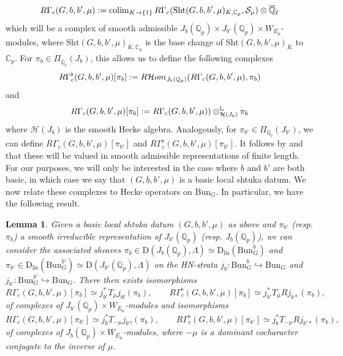 \documentclass[reqno,11pt]{amsart}
\newtheorem{lemma}[theorem]{Lemma}
\theoremstyle{remark}
\def\colim{\mathop{\rm colim}\nolimits}
\newcommand{\Q}{\mathbb{Q}}
\newcommand{\ov}{\overline}
\newcommand{\Sht}{\mathrm{Sht}}
\newcommand{\Bun}{\mathrm{Bun}}
\newcommand{\Dc}{\mathrm{D}}
\newcommand{\Dlis}{\mathrm{D}_{\mathrm{lis}}}
\begin{document}
\[ R\Gamma_{c}(G,b,b',\mu) := \colim_{K \rightarrow \{1\}} R\Gamma_{c}(\Sht(G,b,b',\mu)_{K,\mathbb{C}_{p}},\mathcal{S}_{\mu}) \otimes \overline{\mathbb{Q}}_{\ell} \]
which will be a complex of smooth admissible $J_{b}(\mathbb{Q}_{p}) \times J_{b'}(\mathbb{Q}_{p}) \times W_{E_{\mu}}$-modules, where $\Sht(G,b,b',\mu)_{K,\mathbb{C}_{p}}$ is the base change of $\Sht(G,b,b',\mu)_{K}$ to $\mathbb{C}_{p}$. For $\pi_{b} \in \Pi_{\ov{\Q}_{\ell}}(J_{b})$, this allows us to define the following complexes 
\begin{equation}{\label{eq: RGammaflat}}
    R\Gamma^{\flat}_{c}(G,b,b',\mu)[\pi_{b}] := R\mathcal{H}om_{J_{b}(\mathbb{Q}_{p})}(R\Gamma_{c}(G,b,b',\mu),\pi_{b})
\end{equation}
and
\begin{equation}{\label{eq: RGamma}}
    R\Gamma_{c}(G,b,b',\mu)[\pi_{b}] := R\Gamma_{c}(G,b,b',\mu)) \otimes^{\mathbb{L}}_{\mathcal{H}(J_{b})} \pi_{b}
\end{equation}
where $\mathcal{H}(J_{b})$ is the smooth Hecke algebra. Analogously, for $\pi_{b'} \in \Pi_{\ov{\Q}_{\ell}}(J_{b'})$, we can define $R\Gamma_{c}(G,b,b',\mu)[\pi_{b'}]$ and $R\Gamma^{\flat}_{c}(G,b,b',\mu)[\pi_{b'}]$. It follows by \cite[Corollary~I.7.3]{FS} and \cite[Page~317]{FS} that these will be valued in smooth admissible representations of finite length. For our purposes, we will only be interested in the case where $b$ and $b'$ are both basic, in which case we say that $(G,b,b',\mu)$ is a basic local shtuka datum. We now relate these complexes to Hecke operators on $\Bun_{G}$. In particular, we have the following result.
\begin{lemma}{\label{shimhecke}}{\cite[Section~IX.3]{FS}}
Given a basic local shtuka datum $(G,b,b',\mu)$ as above and $\pi_{b'}$ (resp. $\pi_{b}$) a smooth irreducible representation of $J_{b'}(\mathbb{Q}_{p})$ (resp. $J_{b}(\mathbb{Q}_{p})$), we can consider the associated sheaves $\pi_{b} \in \Dc(J_{b}(\mathbb{Q}_{p}),\Lambda) \simeq \Dlis(\Bun_{G}^{b})$ and $\pi_{b'} \in \Dlis(\Bun_{G}^{b'}) \simeq \Dc(J_{b'}(\mathbb{Q}_{p}),\Lambda)$ on the HN-strata $j_{b}: \Bun_{G}^{b} \hookrightarrow \Bun_{G}$ and $j_{b'}: \Bun_{G}^{b'} \hookrightarrow \Bun_{G}$. There then exists isomorphisms
\[ R\Gamma_{c}(G,b,b',\mu)[\pi_{b}] \simeq  j_{b'}^{*}T_{\mu}j_{b!}(\pi_{b}), \qquad  R\Gamma^{\flat}_{c}(G,b,b',\mu)[\pi_{b}] \simeq  j_{b'}^{*}T_{\mu}Rj_{b*}(\pi_{b}),\]
of complexes of $J_{b'}(\mathbb{Q}_{p}) \times W_{E_{\mu}}$-modules and isomorphisms
\[ R\Gamma_{c}(G,b,b',\mu)[\pi_{b'}] \simeq j_{b}^{*}T_{-\mu}j_{b'!}(\pi_{b}), \qquad  R\Gamma^{\flat}_{c}(G,b,b',\mu)[\pi_{b'}] \simeq j_{b}^{*}T_{-\mu}Rj_{b'*}(\pi_{b}), \]
of complexes of $J_{b}(\mathbb{Q}_{p}) \times W_{E_{\mu}}$-modules, where $-\mu$ is a dominant cocharacter conjugate to the inverse of $\mu$. 
\end{lemma}
\end{document}

